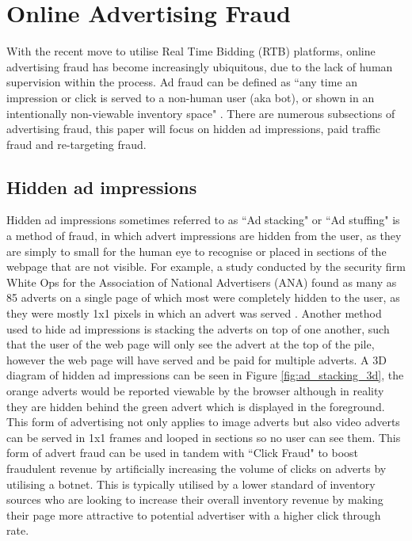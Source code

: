 \documentclass[12pt]{article}
\begin{document}
\section{Online Advertising Fraud}
With the recent move to utilise Real Time Bidding (RTB) platforms, online advertising fraud has become increasingly ubiquitous, due to the lack of human supervision within the process. Ad fraud can be defined as ``any time an impression or click is served to a non-human user (aka bot), or shown in an intentionally non-viewable inventory space" \parencite{dstillery}. There are numerous subsections of advertising fraud, this paper will focus on hidden ad impressions, paid traffic fraud and re-targeting fraud.   


\subsection{Hidden ad impressions}
Hidden ad impressions sometimes referred to as ``Ad stacking" or ``Ad stuffing" is a method of fraud, in which advert impressions are hidden from the user, as they are simply to small for the human eye to recognise or placed in sections of the webpage that are not visible. For example, a study conducted by the security firm White Ops for the Association of National Advertisers (ANA) found as many as 85 adverts on a single page of which most were completely hidden to the user, as they were mostly 1x1 pixels in which an advert was served \parencite{botfraud2015}. Another method used to hide ad impressions is stacking the adverts on top of one another, such that the user of the web page will only see the advert at the top of the pile, however the web page will have served and be paid for multiple adverts. A 3D diagram of hidden ad impressions can be seen in Figure \ref{fig:ad_stacking_3d}, the orange adverts would be reported viewable by the browser although in reality they are hidden behind the green advert which is displayed in the foreground.  \\

This form of advertising not only applies to image adverts but also video adverts can be served in 1x1 frames and looped in sections so no user can see them. This form of advert fraud can be used in tandem with ``Click Fraud" to boost fraudulent revenue by artificially increasing the volume of clicks on adverts by utilising a botnet. This is typically utilised by a lower standard of inventory sources who are looking to increase their overall inventory revenue by making their page more attractive to potential advertiser with a higher click through rate.   \\
\end{document}
